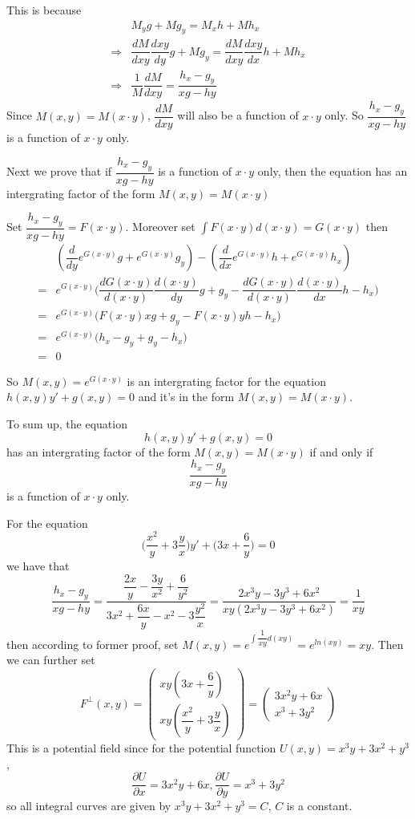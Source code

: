 \documentclass[a4paper,12pt,titlepage]{article}
\begin{document}
This is because
\begin{align*}
&M_yg+Mg_y=M_xh+Mh_x\\
\Rightarrow &\dfrac{dM}{dxy}\dfrac{dxy}{dy}g+Mg_y=\dfrac{dM}{dxy}\dfrac{dxy}{dx}h+Mh_x\\
\Rightarrow &\dfrac{1}{M}\dfrac{dM}{dxy}=\dfrac{h_x-g_y}{xg-hy}
\end{align*}
Since $M(x,y)=M(x\cdot y)$, $\dfrac{dM}{dxy}$ will also be a function of $x\cdot y$ only. So $\dfrac{h_x-g_y}{xg-hy}$ is a function of $x\cdot y$ only.

Next we prove that if $\dfrac{h_x-g_y}{xg-hy}$ is a function of $x\cdot y$ only, then the equation has an intergrating factor of the form $M(x,y)=M(x\cdot y)$

Set $\dfrac{h_x-g_y}{xg-hy}=F(x\cdot y)$. Moreover set $\int F(x\cdot y)d(x\cdot y)=G(x\cdot y)$  then 
\begin{align*}
&(\dfrac{d}{dy}e^{G(x\cdot y)}g+e^{G(x\cdot y)}g_y)-(\dfrac{d}{dx}e^{G(x\cdot y)}h+e^{G(x\cdot y)}h_x)\\
=&e^{G(x\cdot y)}\Big(\dfrac{d G(x\cdot y)}{d(x\cdot y)}\dfrac{d(x\cdot y)}{dy}g+g_y-\dfrac{d G(x\cdot y)}{d(x\cdot y)}\dfrac{d(x\cdot y)}{dx}h-h_x\Big)\\
=&e^{G(x\cdot y)}\Big(F(x\cdot y)xg+g_y-F(x\cdot y)yh-h_x\Big)\\
=&e^{G(x\cdot y)}\Big(h_x-g_y+g_y-h_x\Big)\\
=&0
\end{align*}

So $M(x,y)=e^{G(x\cdot y)}$ is an intergrating factor for the equation $h(x,y)y'+g(x,y)=0$ and it's in the form $M(x,y)=M(x\cdot y)$.

To sum up, the equation 
$$h(x,y)y'+g(x,y)=0$$
has an intergrating factor of the form $M(x,y)=M(x\cdot y)$ if and only if
$$\dfrac{h_x-g_y}{xg-hy}$$
is a function of $x\cdot y$ only.

For the equation
$$\Big(\dfrac{x^2}{y}+3\dfrac{y}{x}\Big)y'+\Big(3x+\dfrac{6}{y}\Big)=0$$
we have that
$$\dfrac{h_x-g_y}{xg-hy}=\dfrac{\dfrac{2x}{y}-\dfrac{3y}{x^2}+\dfrac{6}{y^2}}{3x^2+\dfrac{6x}{y}-x^2-3\dfrac{y^2}{x}}=\dfrac{2x^3y-3y^3+6x^2}{xy(2x^3y-3y^3+6x^2)}=\dfrac{1}{xy}$$
then according to former proof, set $M(x,y)=e^{\int \dfrac{1}{xy}d(xy)}=e^{ln(xy)}=xy$. Then we can further set
$$F^{\perp}(x,y)=\begin{pmatrix}
xy(3x+\dfrac{6}{y})\\xy(\dfrac{x^2}{y}+3\dfrac{y}{x})\end{pmatrix}=\begin{pmatrix}
3x^2y+6x\\x^3+3y^2\end{pmatrix}$$
This is a potential field since for the potential function $U(x,y)=x^3y+3x^2+y^3$,
$$\dfrac{\partial U}{\partial x}=3x^2y+6x,\dfrac{\partial U}{\partial y}=x^3+3y^2$$
so all integral curves are given by $x^3y+3x^2+y^3=C$, $C$ is a constant.
\end{document}
